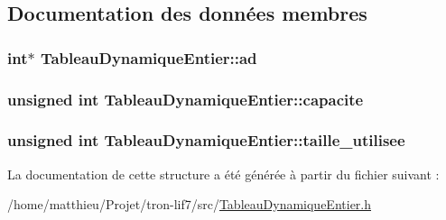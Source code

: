 \subsection{Documentation des données membres}
\hypertarget{structTableauDynamiqueEntier_a2ebf85c435f6e7db67050c4fbcaf62a9}{
\subsubsection[{ad}]{\setlength{\rightskip}{0pt plus 5cm}int$\ast$ Tableau\-Dynamique\-Entier\-::ad}}\label{structTableauDynamiqueEntier_a2ebf85c435f6e7db67050c4fbcaf62a9}
\hypertarget{structTableauDynamiqueEntier_a1fbdd8e4a11ba95e5a802fe9bb6cc2ff}{
\subsubsection[{capacite}]{\setlength{\rightskip}{0pt plus 5cm}unsigned int Tableau\-Dynamique\-Entier\-::capacite}}\label{structTableauDynamiqueEntier_a1fbdd8e4a11ba95e5a802fe9bb6cc2ff}
\hypertarget{structTableauDynamiqueEntier_ac7a23b3a002b4ce72556a1d5cebd3025}{
\subsubsection[{taille\-\_\-utilisee}]{\setlength{\rightskip}{0pt plus 5cm}unsigned int Tableau\-Dynamique\-Entier\-::taille\-\_\-utilisee}}\label{structTableauDynamiqueEntier_ac7a23b3a002b4ce72556a1d5cebd3025}


La documentation de cette structure a été générée à partir du fichier suivant \-:\begin{DoxyCompactItemize}
\item 
/home/matthieu/\-Projet/tron-\/lif7/src/\hyperlink{TableauDynamiqueEntier_8h}{Tableau\-Dynamique\-Entier.\-h}\end{DoxyCompactItemize}
